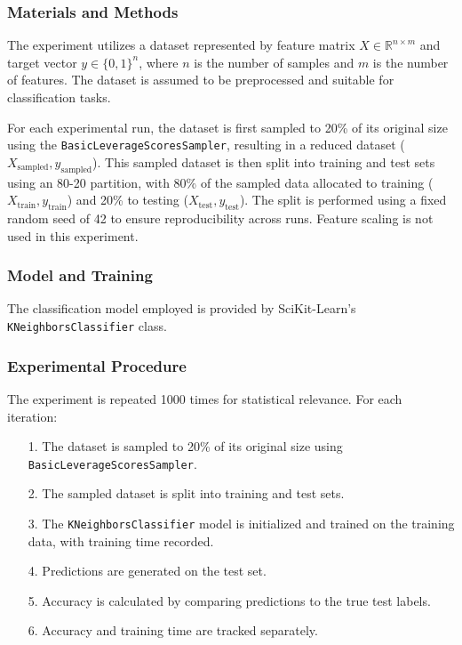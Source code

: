 \documentclass{article}
\theoremstyle{plain}
\theoremstyle{definition}
\theoremstyle{remark}
\begin{document}
\subsubsection{Materials and Methods}

The experiment utilizes a dataset represented by feature matrix $ X \in \mathbb{R}^{n \times m} $ and target vector $ y \in \{0, 1\}^n $, where $ n $ is the number of samples and $ m $ is the number of features. The dataset is assumed to be preprocessed and suitable for classification tasks.

For each experimental run, the dataset is first sampled to 20\% of its original size using the \texttt{BasicLeverageScoresSampler}, resulting in a reduced dataset ($ X_{\text{sampled}}, y_{\text{sampled}} $). This sampled dataset is then split into training and test sets using an 80-20 partition, with 80\% of the sampled data allocated to training ($ X_{\text{train}}, y_{\text{train}} $) and 20\% to testing ($ X_{\text{test}}, y_{\text{test}} $). The split is performed using a fixed random seed of 42 to ensure reproducibility across runs. Feature scaling is not used in this experiment.

\subsubsection{Model and Training}

The classification model employed is provided by SciKit-Learn's \texttt{KNeighborsClassifier} class.

\subsubsection{Experimental Procedure}

The experiment is repeated 1000 times for statistical relevance. For each iteration:

\begin{itemize}
	\item [1.] The dataset is sampled to 20\% of its original size using \texttt{BasicLeverageScoresSampler}.
	\item [2.] The sampled dataset is split into training and test sets.
	\item [3.] The \texttt{KNeighborsClassifier} model is initialized and trained on the training data, with training time recorded.
	\item [4.] Predictions are generated on the test set.
	\item [5.] Accuracy is calculated by comparing predictions to the true test labels.
	\item [6.] Accuracy and training time are tracked separately.
\end{itemize}
\end{document}
